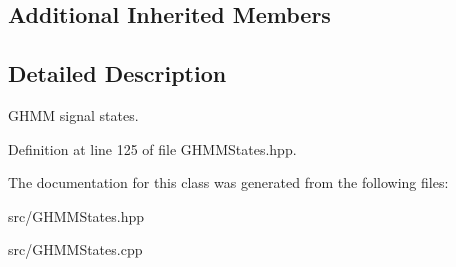 \subsection*{Additional Inherited Members}


\subsection{Detailed Description}
G\+H\+MM signal states. 

Definition at line 125 of file G\+H\+M\+M\+States.\+hpp.



The documentation for this class was generated from the following files\+:\begin{DoxyCompactItemize}
\item 
src/G\+H\+M\+M\+States.\+hpp\item 
src/G\+H\+M\+M\+States.\+cpp\end{DoxyCompactItemize}
